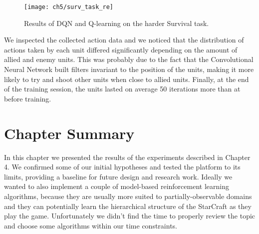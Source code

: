\begin{figure}[h]
    \centering
    \texttt{[image: ch5/surv\_task\_re]}
    \caption{Results of DQN and Q-learning on the harder Survival task.}
    \label{fig:surv_task_results}
\end{figure}

We inspected the collected action data and we noticed that the distribution of
actions taken by each unit differed significantly depending on the amount of
allied and enemy units. This was probably due to the fact that the Convolutional
Neural Network built filters invariant to the position of the units, making it
more likely to try and shoot other units when close to allied units. Finally,
at the end of the training session, the units lasted on average 50 iterations
more than at before training.

\section{Chapter Summary}

In this chapter we presented the results of the experiments described in Chapter
4. We confirmed some of our initial hypotheses and tested the platform to its
limits, providing a baseline for future design and research work. Ideally we
wanted to also implement a couple of model-based reinforcement learning
algorithms, because they are usually more suited to partially-observable domains
and they can potentially learn the hierarchical structure of the StarCraft as
they play the game. Unfortunately we didn't find the time to properly review the
topic and choose some algorithms within our time constraints.
